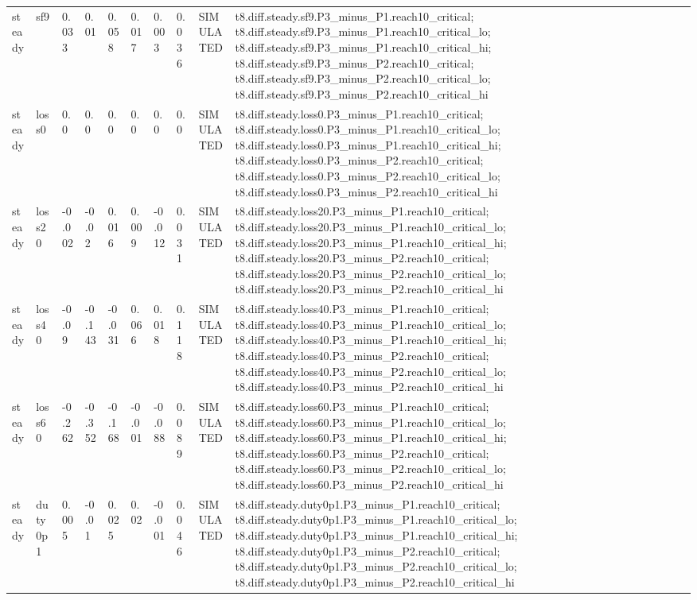 \begin{table}[t]
\begin{tabular}{llllllllll}
steady & sf9 & 0.033 & 0.01 & 0.058 & 0.017 & 0.003 & 0.036 & SIMULATED & t8.diff.steady.sf9.P3\_minus\_P1.reach10\_critical; t8.diff.steady.sf9.P3\_minus\_P1.reach10\_critical\_lo; t8.diff.steady.sf9.P3\_minus\_P1.reach10\_critical\_hi; t8.diff.steady.sf9.P3\_minus\_P2.reach10\_critical; t8.diff.steady.sf9.P3\_minus\_P2.reach10\_critical\_lo; t8.diff.steady.sf9.P3\_minus\_P2.reach10\_critical\_hi \\
steady & loss0 & 0.0 & 0.0 & 0.0 & 0.0 & 0.0 & 0.0 & SIMULATED & t8.diff.steady.loss0.P3\_minus\_P1.reach10\_critical; t8.diff.steady.loss0.P3\_minus\_P1.reach10\_critical\_lo; t8.diff.steady.loss0.P3\_minus\_P1.reach10\_critical\_hi; t8.diff.steady.loss0.P3\_minus\_P2.reach10\_critical; t8.diff.steady.loss0.P3\_minus\_P2.reach10\_critical\_lo; t8.diff.steady.loss0.P3\_minus\_P2.reach10\_critical\_hi \\
steady & loss20 & -0.002 & -0.02 & 0.016 & 0.009 & -0.012 & 0.031 & SIMULATED & t8.diff.steady.loss20.P3\_minus\_P1.reach10\_critical; t8.diff.steady.loss20.P3\_minus\_P1.reach10\_critical\_lo; t8.diff.steady.loss20.P3\_minus\_P1.reach10\_critical\_hi; t8.diff.steady.loss20.P3\_minus\_P2.reach10\_critical; t8.diff.steady.loss20.P3\_minus\_P2.reach10\_critical\_lo; t8.diff.steady.loss20.P3\_minus\_P2.reach10\_critical\_hi \\
steady & loss40 & -0.09 & -0.143 & -0.031 & 0.066 & 0.018 & 0.118 & SIMULATED & t8.diff.steady.loss40.P3\_minus\_P1.reach10\_critical; t8.diff.steady.loss40.P3\_minus\_P1.reach10\_critical\_lo; t8.diff.steady.loss40.P3\_minus\_P1.reach10\_critical\_hi; t8.diff.steady.loss40.P3\_minus\_P2.reach10\_critical; t8.diff.steady.loss40.P3\_minus\_P2.reach10\_critical\_lo; t8.diff.steady.loss40.P3\_minus\_P2.reach10\_critical\_hi \\
steady & loss60 & -0.262 & -0.352 & -0.168 & -0.001 & -0.088 & 0.089 & SIMULATED & t8.diff.steady.loss60.P3\_minus\_P1.reach10\_critical; t8.diff.steady.loss60.P3\_minus\_P1.reach10\_critical\_lo; t8.diff.steady.loss60.P3\_minus\_P1.reach10\_critical\_hi; t8.diff.steady.loss60.P3\_minus\_P2.reach10\_critical; t8.diff.steady.loss60.P3\_minus\_P2.reach10\_critical\_lo; t8.diff.steady.loss60.P3\_minus\_P2.reach10\_critical\_hi \\
steady & duty0p1 & 0.005 & -0.01 & 0.025 & 0.02 & -0.001 & 0.046 & SIMULATED & t8.diff.steady.duty0p1.P3\_minus\_P1.reach10\_critical; t8.diff.steady.duty0p1.P3\_minus\_P1.reach10\_critical\_lo; t8.diff.steady.duty0p1.P3\_minus\_P1.reach10\_critical\_hi; t8.diff.steady.duty0p1.P3\_minus\_P2.reach10\_critical; t8.diff.steady.duty0p1.P3\_minus\_P2.reach10\_critical\_lo; t8.diff.steady.duty0p1.P3\_minus\_P2.reach10\_critical\_hi \\

\end{tabular}
\end{table}
